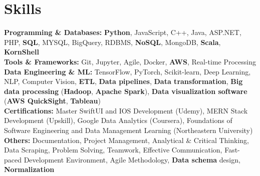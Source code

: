 \documentclass[a4paper,10pt]{article}
\begin{document}
\section*{Skills}
\textbf{Programming \& Databases: } \textbf{Python}, JavaScript, C++, Java, ASP.NET, PHP, \textbf{SQL}, MYSQL, BigQuery, RDBMS, \textbf{NoSQL}, MongoDB, \textbf{Scala}, \textbf{KornShell} \\
\textbf{Tools & Frameworks:}   Git, Jupyter, Agile, Docker, \textbf{AWS}, Real-time Processing\\
\textbf{Data Engineering \& ML: } TensorFlow, PyTorch, Scikit-learn, Deep Learning, NLP, Computer Vision, \textbf{ETL}, \textbf{Data pipelines}, \textbf{Data transformation}, \textbf{Big data processing} (\textbf{Hadoop}, \textbf{Apache Spark}), \textbf{Data visualization software} (\textbf{AWS QuickSight}, \textbf{Tableau})\\
\textbf{Certifications:} Master SwiftUI and IOS Development (Udemy), MERN Stack Development (Upskill), Google Data Analytics (Coursera), Foundations of Software Engineering and Data Management Learning (Northeastern University) \\
\textbf{Others: }Documentation, Project Management, Analytical \& Critical Thinking, Data Scraping, Problem Solving, Teamwork, Effective Communication, Fast-paced Development Environment, Agile Methodology, \textbf{Data schema} design, \textbf{Normalization} \\

\vspace{-4mm}
\end{document}
